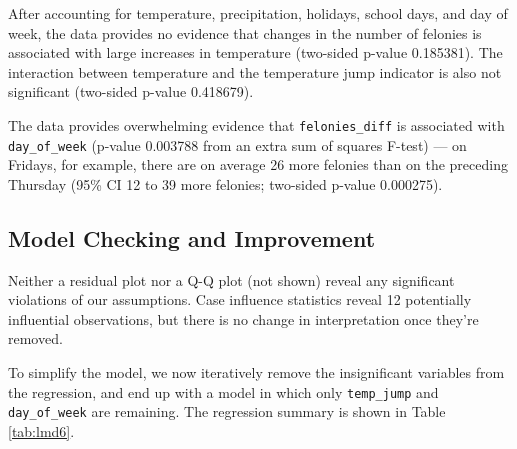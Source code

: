 \documentclass[11pt,notitlepage]{article}
\newenvironment{codeSmall}%
   {\par\noindent\adjustbox{margin=1ex,bgcolor=shadecolor,margin=0ex \medskipamount}\bgroup\minipage\linewidth\verbatim\footnotesize}%
   {\endverbatim\endminipage\egroup}
\begin{document}



After accounting for temperature, precipitation, holidays, school days, and day of week, the data provides no evidence that changes in the number of felonies is associated with large increases in temperature (two-sided p-value 0.185381). The interaction between temperature and the temperature jump indicator is also not significant (two-sided p-value 0.418679).

The data provides overwhelming evidence that \texttt{felonies_diff} is associated with \texttt{day_of_week} (p-value 0.003788 from an extra sum of squares F-test) --- on Fridays, for example, there are on average 26 more felonies than on the preceding Thursday (95\% CI 12 to 39 more felonies; two-sided p-value 0.000275).


\subsection{Model Checking and Improvement}
\label{sec:modelFeloniesDiffModelCheckingImprovement}


Neither a residual plot nor a Q-Q plot (not shown) reveal any significant violations of our assumptions. Case influence statistics reveal 12 potentially influential observations, but there is no change in interpretation once they're removed.

To simplify the model, we now iteratively remove the insignificant variables from the regression, and end up with a model in which only \texttt{temp_jump} and \texttt{day_of_week} are remaining. The regression summary is shown in Table \ref{tab:lmd6}.

\end{document}
